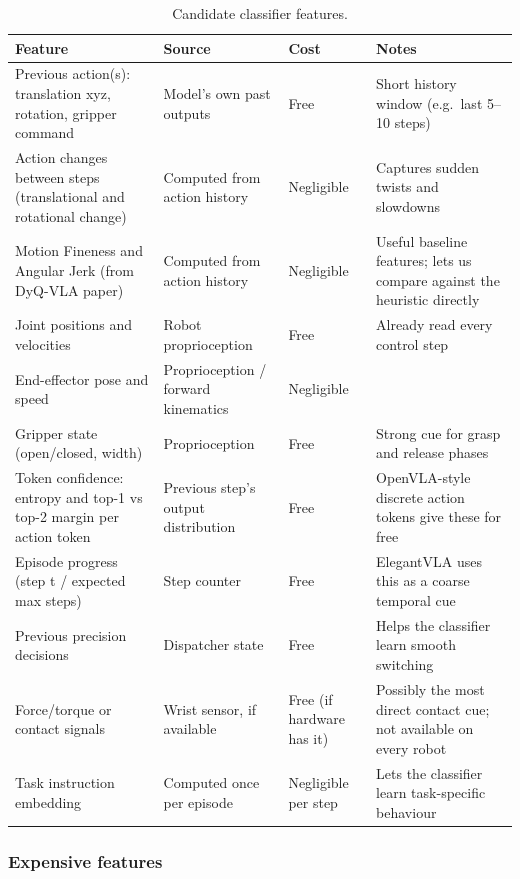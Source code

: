 \documentclass[11pt]{article}
\begin{document}
\begin{table}[h]
\centering
\small
\begin{tabularx}{\textwidth}{>{\raggedright\arraybackslash}X >{\raggedright\arraybackslash}p{} >{\raggedright\arraybackslash}p{} >{\raggedright\arraybackslash}X}
\toprule
\textbf{Feature} & \textbf{Source} & \textbf{Cost} & \textbf{Notes} \\
\midrule
Previous action(s): translation xyz, rotation, gripper command & Model's own past outputs & Free & Short history window (e.g.~last 5--10 steps) \\
Action changes between steps (translational and rotational change) & Computed from action history & Negligible & Captures sudden twists and slowdowns \\
Motion Fineness and Angular Jerk (from DyQ-VLA paper) & Computed from action history & Negligible & Useful baseline features; lets us compare against the heuristic directly \\
Joint positions and velocities & Robot proprioception & Free & Already read every control step \\
End-effector pose and speed & Proprioception / forward kinematics & Negligible &  \\
Gripper state (open/closed, width) & Proprioception & Free & Strong cue for grasp and release phases \\
Token confidence: entropy and top-1 vs top-2 margin per action token & Previous step's output distribution & Free & OpenVLA-style discrete action tokens give these for free \\
Episode progress (step t / expected max steps) & Step counter & Free & ElegantVLA uses this as a coarse temporal cue \\
Previous precision decisions & Dispatcher state & Free & Helps the classifier learn smooth switching \\
Force/torque or contact signals & Wrist sensor, if available & Free (if hardware has it) & Possibly the most direct contact cue; not available on every robot \\
Task instruction embedding & Computed once per episode & Negligible per step & Lets the classifier learn task-specific behaviour \\
\bottomrule
\end{tabularx}
\caption{Candidate classifier features.}
\end{table}

\subsubsection{Expensive features}\label{expensive-features}
\end{document}
